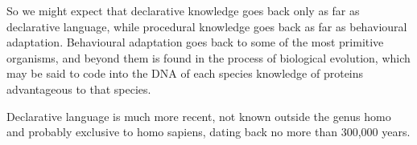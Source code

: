 So we might expect that declarative knowledge goes back only as far as declarative language, while procedural knowledge goes back as far as behavioural adaptation.
Behavioural adaptation goes back to some of the most primitive organisms, and beyond them is found in the process of biological evolution, which may be said to code into the DNA of each species knowledge of proteins advantageous to that species.

Declarative language is much more recent, not known outside the genus homo and probably exclusive to homo sapiens, dating back no more than 300,000 years.






